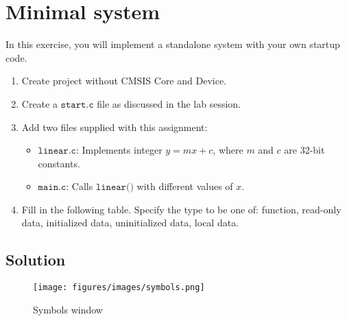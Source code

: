 \section*{Minimal system}

In this exercise, you will implement a standalone system with your own startup code.

\begin{enumerate}[itemsep=0pt]
    \item Create project without CMSIS Core and Device.
    \item Create a \(\texttt{start.c}\) file as discussed in the lab session.
    \item Add two files supplied with this assignment:
        \begin{itemize}
            \item \(\texttt{linear.c}\): Implements integer \(y = mx + c\), where \(m\) and \(c\) are 32-bit constants.
            \item \(\texttt{main.c}\): Calls \(\texttt{linear()}\) with diﬀerent values of \(x\).
        \end{itemize}
    \item Fill in the following table.
        Specify the type to be one of:
        function, read-only data, initialized data, uninitialized data, local data.
\end{enumerate}

\subsection*{Solution}

\begin{table}[htbp]
    \centering
    
\end{table}

\begin{figure*}[htbp]
    \centering
    \texttt{[image: figures/images/symbols.png]}
    \caption{
        Symbols window
    }\label{fig:symbols}
\end{figure*}
